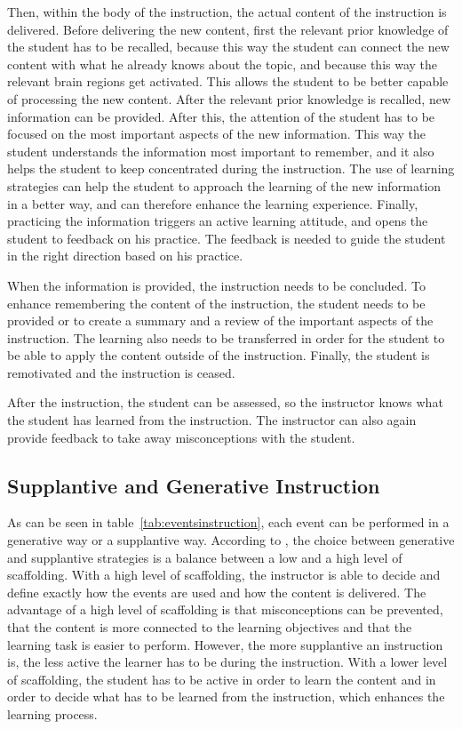 \documentclass[11pt,twoside]{report} %
\begin{document}
Then, within the body of the instruction, the actual content of the instruction is delivered. Before delivering the new content, first the relevant prior knowledge of the student has to be recalled, because this way the student can connect the new content with what he already knows about the topic, and because this way the relevant brain regions get activated. This allows the student to be better capable of processing the new content. After the relevant prior knowledge is recalled, new information can be provided. After this, the attention of the student has to be focused on the most important aspects of the new information. This way the student understands the information most important to remember, and it also helps the student to keep concentrated during the instruction. The use of learning strategies can help the student to approach the learning of the new information in a better way, and can therefore enhance the learning experience. Finally, practicing the information triggers an active learning attitude, and opens the student to feedback on his practice. The feedback is needed to guide the student in the right direction based on his practice.

When the information is provided, the instruction needs to be concluded. To enhance remembering the content of the instruction, the student needs to be provided or to create a summary and a review of the important aspects of the instruction. The learning also needs to be transferred in order for the student to be able to apply the content outside of the instruction. Finally, the student is remotivated and the instruction is ceased.

After the instruction, the student can be assessed, so the instructor knows what the student has learned from the instruction. The instructor can also again provide feedback to take away misconceptions with the student.

\subsection{Supplantive and Generative Instruction}

As can be seen in table~\ref{tab:eventsinstruction}, each event can be performed in a generative way or a supplantive way. According to , the choice between generative and supplantive strategies is a balance between a low and a high level of scaffolding. With a high level of scaffolding, the instructor is able to decide and define exactly how the events are used and how the content is delivered. The advantage of a high level of scaffolding is that misconceptions can be prevented, that the content is more connected to the learning objectives and that the learning task is easier to perform. However, the more supplantive an instruction is, the less active the learner has to be during the instruction. With a lower level of scaffolding, the student has to be active in order to learn the content and in order to decide what has to be learned from the instruction, which enhances the learning process.
\end{document}
